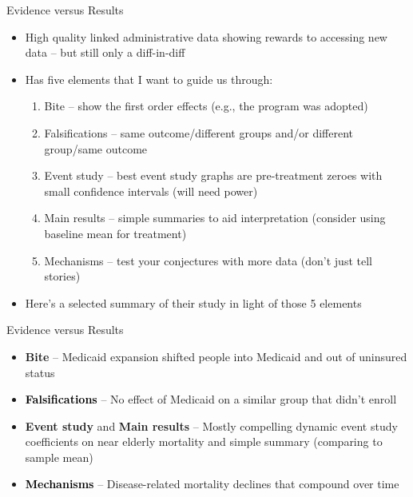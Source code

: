 \documentclass{beamer}
\begin{document}
\begin{frame}{Evidence versus Results}

\begin{itemize}
\item High quality linked administrative data showing rewards to accessing new data -- but still only a diff-in-diff
\item Has five elements that I want to guide us through:
	\begin{enumerate}
	\item Bite -- show the first order effects (e.g., the program was adopted)
	\item Falsifications -- same outcome/different groups and/or different group/same outcome
	\item Event study -- best event study graphs are pre-treatment zeroes with small confidence intervals (will need power)
	\item Main results -- simple summaries to aid interpretation (consider using baseline mean for treatment)
	\item Mechanisms -- test your conjectures with more data (don't just tell stories)
	\end{enumerate}
\item Here's a selected summary of their study in light of those 5 elements
\end{itemize}

\end{frame}



\begin{frame}{Evidence versus Results}

\begin{itemize}
\item \textbf{Bite} -- Medicaid expansion shifted people into Medicaid and out of uninsured status
\item \textcolor{black}{\textbf{Falsifications}} -- No effect of Medicaid on a similar group that didn't enroll
\item \textbf{Event study} and \textbf{Main results} -- Mostly compelling dynamic event study coefficients on near elderly mortality and simple summary (comparing to sample mean)
\item \textcolor{black}{\textbf{Mechanisms}} --  Disease-related mortality declines that compound over time
\end{itemize}

\end{frame}
\end{document}
